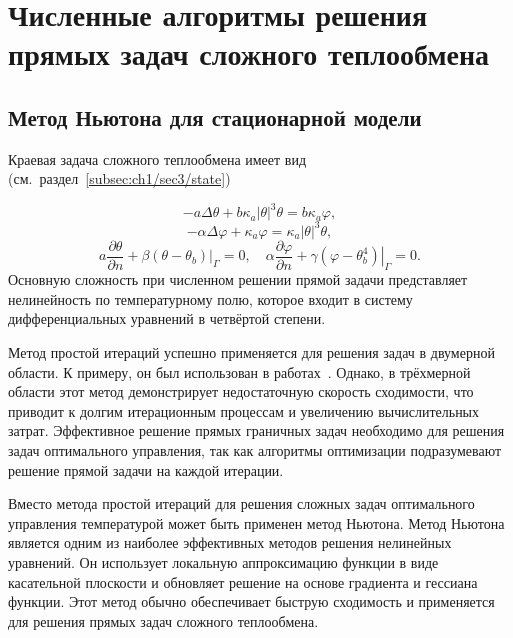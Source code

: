 \section{Численные алгоритмы решения прямых задач сложного теплообмена}
\label{sec:ch4/sec1}

\subsection{Метод Ньютона для стационарной модели}
\label{subsec:ch4/sec1/stationary}
Краевая задача сложного теплообмена
имеет вид (см.\ раздел~\ref{subsec:ch1/sec3/state})

\begin{equation}
    \label{eq:4_1:1}
    -a \Delta \theta+b \kappa_{a}| \theta|^{3} \theta =
    b \kappa_{a} \varphi,
\end{equation}
\begin{equation}
    \label{eq:4_1:2}
    -\alpha \Delta \varphi+\kappa_{a} \varphi =
    \kappa_{a}|\theta|^{3} \theta,
\end{equation}
\begin{equation}
    \label{eq:4_1:3}
    a \frac{\partial \theta}{\partial n}
    +\left.\beta\left(\theta-\theta_{b}\right)\right|_{\Gamma}=0,
    \quad \alpha \frac{\partial \varphi}{\partial n}
    +\left.\gamma\left(\varphi-\theta_{b}^{4}\right)\right|_{\Gamma}=0.
\end{equation}
Основную сложность при численном решении прямой задачи представляет нелинейность
по температурному полю, которое входит в систему
дифференциальных уравнений в четвёртой степени.

Метод простой итераций успешно применяется для решения задач в двумерной области.
К примеру, он был использован в работах~\cite{Kovtanyuk2015,astrakhantseva2014numerical}.
Однако, в трёхмерной области этот метод демонстрирует недостаточную скорость сходимости,
что приводит к долгим итерационным процессам и увеличению вычислительных затрат.
Эффективное решение прямых граничных задач необходимо для решения задач оптимального управления,
так как алгоритмы оптимизации подразумевают решение прямой задачи на каждой итерации.


Вместо метода простой итераций для решения сложных задач оптимального управления
температурой может быть применен метод Ньютона.
Метод Ньютона является одним из наиболее эффективных методов решения нелинейных уравнений.
Он использует локальную аппроксимацию функции в виде касательной плоскости
и обновляет решение на основе градиента и гессиана функции.
Этот метод обычно обеспечивает быструю сходимость и применяется
для решения прямых задач сложного теплообмена.

